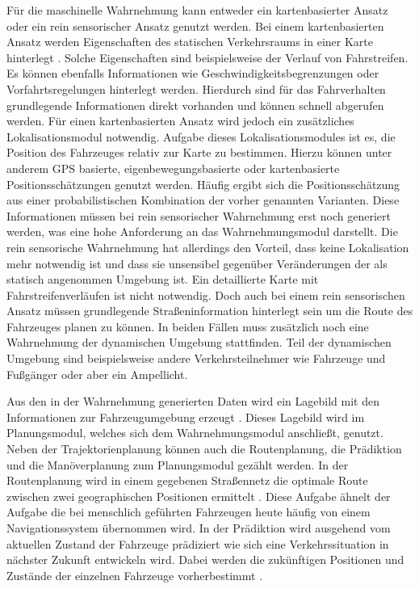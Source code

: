 F\"ur die maschinelle Wahrnehmung kann entweder ein kartenbasierter Ansatz oder ein rein sensorischer Ansatz genutzt werden.
Bei einem kartenbasierten Ansatz werden Eigenschaften des statischen Verkehrsraums in einer Karte hinterlegt \cite{Ziegler2017}. 
Solche Eigenschaften sind beispielsweise der Verlauf von Fahrstreifen. 
Es k\"onnen ebenfalls Informationen wie Geschwindigkeitsbegrenzungen oder Vorfahrtsregelungen hinterlegt werden. 
Hierdurch sind f\"ur das Fahrverhalten grundlegende Informationen direkt vorhanden und k\"onnen schnell abgerufen werden. 
F\"ur einen kartenbasierten Ansatz wird jedoch ein zus\"atzliches Lokalisationsmodul notwendig.
Aufgabe dieses Lokalisationsmodules ist es, die Position des Fahrzeuges relativ zur Karte zu bestimmen.
Hierzu k\"onnen unter anderem GPS basierte, eigenbewegungsbasierte oder kartenbasierte Positionssch\"atzungen  genutzt werden. 
H\"aufig ergibt sich die Positionssch\"atzung aus einer probabilistischen Kombination der vorher genannten Varianten. 
Diese Informationen m\"ussen bei rein sensorischer Wahrnehmung erst noch generiert werden, was eine hohe Anforderung an das Wahrnehmungsmodul darstellt. 
Die rein sensorische Wahrnehmung hat allerdings den Vorteil, dass keine Lokalisation mehr notwendig ist und dass sie unsensibel gegen\"uber Ver\"anderungen der als statisch angenommen Umgebung ist.
Ein detaillierte Karte mit Fahrstreifenverl\"aufen ist nicht notwendig.
Doch auch bei einem rein sensorischen Ansatz m\"ussen grundlegende Stra{\ss}eninformation hinterlegt sein um die Route des Fahrzeuges planen zu k\"onnen.
In beiden F\"allen muss zus\"atzlich noch eine Wahrnehmung der dynamischen Umgebung stattfinden.
Teil der dynamischen Umgebung sind beispielsweise andere Verkehrsteilnehmer wie Fahrzeuge und Fu{\ss}g\"anger oder aber ein Ampellicht. \cite{Ziegler2017}

Aus den in der Wahrnehmung generierten Daten wird ein Lagebild mit den Informationen zur Fahrzeugumgebung erzeugt \cite{Ziegler2017}. 
Dieses Lagebild wird im Planungsmodul, welches sich dem Wahrnehmungsmodul anschlie{\ss}t, genutzt. 
Neben der Trajektorienplanung k\"onnen auch die Routenplanung, die Pr\"adiktion und die Man\"overplanung zum Planungsmodul gez\"ahlt werden. 
In der Routenplanung wird in einem gegebenen Stra{\ss}ennetz die optimale Route zwischen zwei geographischen Positionen ermittelt \cite{Zhang2013}. 
Diese Aufgabe \"ahnelt der Aufgabe die bei menschlich gef\"uhrten Fahrzeugen heute h\"aufig von einem Navigationssystem \"ubernommen wird. 
In der Pr\"adiktion wird ausgehend vom aktuellen Zustand der Fahrzeuge pr\"adiziert wie sich eine Verkehrssituation in n\"achster Zukunft entwickeln wird.
Dabei werden die zuk\"unftigen Positionen und Zust\"ande der einzelnen Fahrzeuge vorherbestimmt \cite{Hermes2009}.


